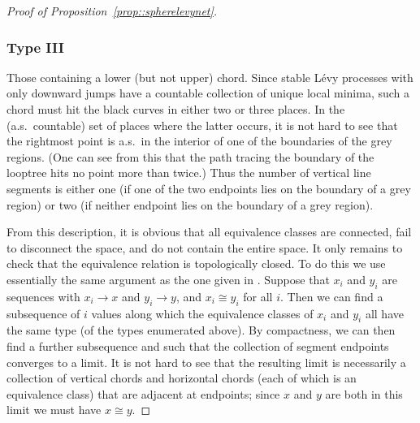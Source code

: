 \documentclass[JEP,XML,SOM,Unicode]{cedram}
\let\oldS\S
\theoremstyle{plain}
\numberwithin{theorem}{section}
\theoremstyle{definition}
\renewcommand{\S}{{\mathbf S}}
\begin{document}
\begin{proof}[Proof of Proposition~\ref{prop::spherelevynet}]
\subsubsection*{Type III}
Those containing a lower (but not upper) chord. Since stable Lévy processes with only downward jumps have a countable collection of unique local minima, such a chord must hit the black curves in either two or three places. In the (a.s.\ countable) set of places where the latter occurs, it is not hard to see that the rightmost point is a.s.\ in the interior of one of the boundaries of the grey regions. (One can see from this that the path tracing the boundary of the looptree hits no point more than twice.) Thus the number of vertical line segments is either one (if one of the two endpoints lies on the boundary of a grey region) or two (if neither endpoint lies on the boundary of a grey region).

\medskip
From this description, it is obvious that all equivalence classes are connected, fail to disconnect the space, and do not contain the entire space. It only remains to check that the equivalence relation is topologically closed. To do this we use essentially the same argument as the one given in \cite[\oldS 1.1]{matingtrees}. Suppose that $x_i$ and $y_i$ are sequences with $x_i \to x$ and $y_i \to y$, and $x_i \cong y_i$ for all $i$. Then we can find a subsequence of $i$ values along which the equivalence classes of $x_i$ and $y_i$ all have the same type (of the types enumerated above). By compactness, we can then find a further subsequence and such that the collection of segment endpoints converges to a limit. It is not hard to see that the resulting limit is necessarily a collection of vertical chords and horizontal chords (each of which is an equivalence class) that are adjacent at endpoints; since $x$ and $y$ are both in this limit we must have $x \cong y$.
\end{proof}
\end{document}
